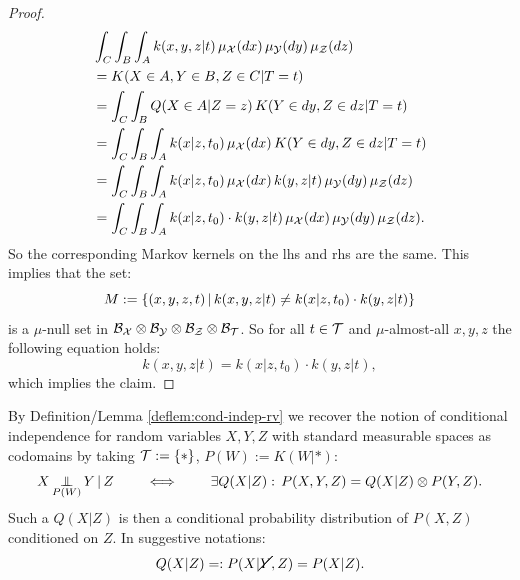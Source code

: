 \begin{Thm}
\begin{proof}
\begin{align*}
          &  \int_C \int_B \int_A k(x,y,z|t) \, \mu_{\mathcal{X}}(dx)\, \mu_{\mathcal{Y}}(dy)\, \mu_{\mathcal{Z}}(dz) \\
        &=  K(X \in A, Y \in B, Z \in C|T=t) \\ 
        &= \int_C \int_B Q(X \in A|Z=z)\,K(Y \in dy, Z \in dz|T=t)  \\ 
        &= \int_C \int_B \int_A k(x|z,t_0) \,\mu_{\mathcal{X}}(dx)\, K(Y \in dy, Z \in dz|T=t)  \\ 
        &= \int_C \int_B \int_A k(x|z,t_0) \,\mu_{\mathcal{X}}(dx)\, k(y,z|t) \, \mu_{\mathcal{Y}}(dy)\, \mu_{\mathcal{Z}}(dz)  \\ 
        &= \int_C \int_B \int_A k(x|z,t_0) \cdot k(y,z|t) \,\mu_{\mathcal{X}}(dx) \, \mu_{\mathcal{Y}}(dy)\, \mu_{\mathcal{Z}}(dz).
    \end{align*}
    So the corresponding Markov kernels on the lhs and rhs are the same.
    This implies that the set:
    \[ M:= \left \{ (x,y,z,t) \,\middle|\, k(x,y,z|t) \neq k(x|z,t_0) \cdot k(y,z|t) \right \} \]
    is a $\mu$-null set in $\mathcal{B}_{\mathcal{X}}\otimes\mathcal{B}_{\mathcal{Y}}\otimes\mathcal{B}_{\mathcal{Z}}\otimes\mathcal{B}_{\mathcal{T}}$.
    So for all $t \in \mathcal{T}$ and $\mu$-almost-all $x,y,z$ the following equation holds:
    \[k(x,y,z|t) = k(x|z,t_0) \cdot k(y,z|t), \]
    which implies the claim.
    \end{proof}
\end{Thm}


\begin{Rem}
    \label{ci-random-variables}
    By Definition/Lemma \ref{deflem:cond-indep-rv} we recover the notion of conditional independence for random variables 
    $X,Y,Z$ with standard measurable spaces as codomains by taking $\mathcal{T}:=\{\ast\}$, $P(W):=K(W|\ast)$:
\[ X \operatorname*{\perp\mkern-11mu\perp}_{P(W)} Y \operatorname*{|} Z \qquad \iff \qquad \exists Q(X|Z):\, P(X,Y,Z) = Q(X|Z) \otimes P(Y,Z).\]
Such a $Q(X|Z)$ is then a conditional probability distribution of $P(X,Z)$ conditioned on $Z$.
In suggestive notations:
\[Q(X|Z) =:P(X|\cancel{Y},Z) = P(X|Z).\]
\end{Rem}



